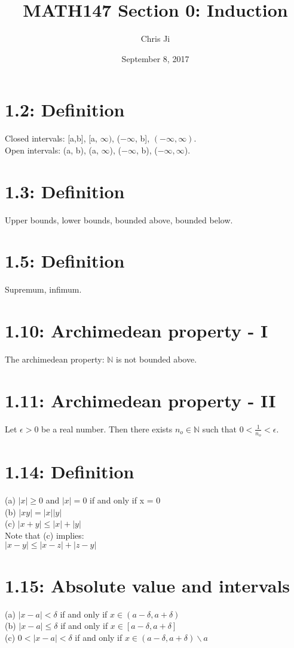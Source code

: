 \documentclass{article}
\title{MATH147 Section 0: Induction}  %
\author{Chris Ji}      %
\date{September 8, 2017}      %
\begin{document}
            

\maketitle     %

\section*{1.2: Definition}
Closed intervals: [a,b], [a, $\infty)$, ($-\infty$, b], $(-\infty, \infty)$. \\
Open intervals: (a, b), (a, $\infty$), ($-\infty$, b), ($-\infty, \infty$).\\ 

\section*{1.3: Definition}
Upper bounds, lower bounds, bounded above, bounded below.

\section*{1.5: Definition}
Supremum, infimum.

\section*{1.10: Archimedean property - I}
The archimedean property: $\mathbb{N}$ is not bounded above. 

\section*{1.11: Archimedean property - II}
Let $\epsilon > 0$ be a real number. Then there exists $n_o \in \mathbb{N}$ such that $0 < \frac{1}{n_o} < \epsilon$. 

\section*{1.14: Definition}
(a) $|x| \geq 0$ and $|x| = 0$ if and only if x = 0\\
(b) $|xy| = |x||y|$\\
(c) $|x+y| \leq |x| + |y|$\\

Note that (c) implies: \\ 
$|x - y| \leq |x - z| + |z - y|$\\ 

\section*{1.15: Absolute value and intervals}
(a) $|x - a| < \delta$ if and only if $x \in (a-\delta, a+\delta)$\\
(b) $|x - a| \leq \delta$ if and only if $x \in [a-\delta, a+\delta]$\\
(c) $0 < |x - a| < \delta$ if and only if $x \in (a-\delta, a+\delta) \backslash {a}$\\
\end{document}
